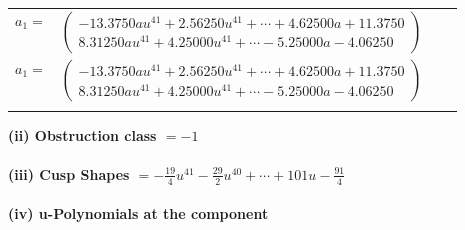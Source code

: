 \documentclass[1p]{elsarticle_modified}
\theoremstyle{definition}
\begin{document}
\begin{tabular}{m{7pt} m{180pt} m{7pt} m{180pt} }
\flushright $a_{1}=$&$\begin{pmatrix}-13.3750 a u^{41}+2.56250 u^{41}+\cdots+4.62500 a+11.3750\\8.31250 a u^{41}+4.25000 u^{41}+\cdots-5.25000 a-4.06250\end{pmatrix}$\\ \flushright $a_{1}=$&$\begin{pmatrix}-13.3750 a u^{41}+2.56250 u^{41}+\cdots+4.62500 a+11.3750\\8.31250 a u^{41}+4.25000 u^{41}+\cdots-5.25000 a-4.06250\end{pmatrix}$\\&\end{tabular}
\flushleft \textbf{(ii) Obstruction class $= -1$}\\~\\
\flushleft \textbf{(iii) Cusp Shapes $= -\frac{19}{4} u^{41}-\frac{29}{2} u^{40}+\cdots+101 u-\frac{91}{4}$}\\~\\
\newpage\renewcommand{\arraystretch}{1}
\flushleft \textbf{(iv) u-Polynomials at the component}\newline \\
\end{document}
